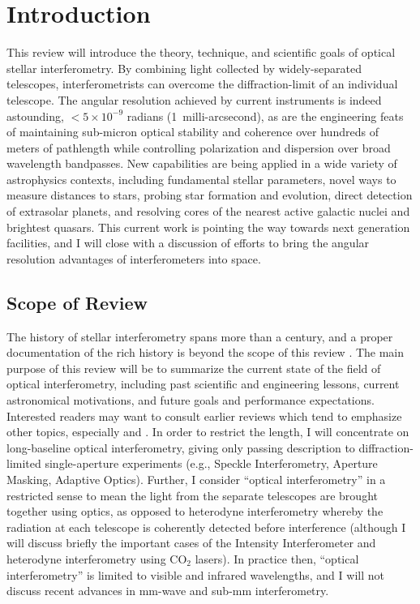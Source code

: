 \documentclass[12pt]{article}
\begin{document}
\section{Introduction}
This review will introduce the theory, technique, and scientific goals
of optical stellar interferometry.  By combining
light collected by widely-separated telescopes, interferometrists can
overcome the diffraction-limit of an individual telescope.  The
angular resolution achieved by current instruments is indeed
astounding, $<5 \times 10^{-9}$ radians (1~milli-arcsecond), as are
the engineering feats of maintaining sub-micron 
optical stability and coherence over hundreds of meters of
pathlength while controlling polarization and dispersion over
broad wavelength bandpasses.
New capabilities are being applied in a wide
variety of astrophysics contexts, including fundamental stellar
parameters, novel ways to measure distances to stars, probing star
formation and evolution, direct detection of extrasolar planets, and
resolving cores of the nearest active galactic nuclei and brightest
quasars.  This current work is pointing the way towards next generation
facilities, and I will close with a discussion of efforts to bring the
angular resolution advantages of interferometers into space.

\subsection{Scope of Review}
The history of stellar interferometry spans more than a century, and a
proper documentation of the rich history is beyond the scope of this
review \citep[see][for a historical overview of the
field]{lawson2000}.  The main purpose of this review will be to
summarize the current state of the field of optical interferometry,
including past scientific and engineering lessons, current
astronomical motivations, and future goals and performance
expectations.  Interested readers may want to consult earlier
reviews which tend to emphasize other topics, especially \citet{sc1992} and \citet{quirrenbach2001}.
In order to restrict the length, I will concentrate on
long-baseline optical interferometry, giving only passing description
to diffraction-limited single-aperture experiments (e.g., Speckle
Interferometry, Aperture Masking, Adaptive Optics).  Further, I
consider ``optical interferometry'' in a restricted sense to mean the
light from the separate telescopes are brought together using optics,
as opposed to heterodyne interferometry whereby the radiation at each
telescope is coherently detected before interference (although I will
discuss briefly the important cases of the Intensity Interferometer
and heterodyne interferometry using CO$_2$ lasers).  In practice then,
``optical interferometry'' is limited to visible and infrared
wavelengths, and I will not discuss recent advances in mm-wave and
sub-mm interferometry.
\end{document}
